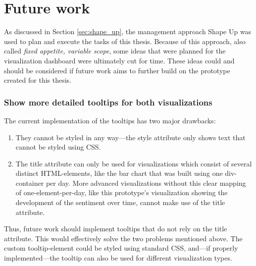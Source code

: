 \section{Future work}\label{sec:cutForTime}
As discussed in Section \ref{sec:shape_up}, the management approach Shape Up was used to plan and execute the tasks of this thesis. Because of this approach, also called \emph{fixed appetite, variable scope}, some ideas that were planned for the visualization dashboard were ultimately cut for time. These ideas could and should be considered if future work aims to further build on the prototype created for this thesis.

\subsubsection*{Show more detailed tooltips for both visualizations}\label{fw_tooltips}
The current implementation of the tooltips has two major drawbacks:
\begin{enumerate}
    \item They cannot be styled in any way---the style attribute only shows text that cannot be styled using CSS.
    \item The title attribute can only be used for visualizations which consist of several distinct HTML-elements, like the bar chart that was built using one div-container per day. More advanced visualizations without this clear mapping of one-element-per-day, like this prototype's visualization showing the development of the sentiment over time, cannot make use of the title attribute.
\end{enumerate}

Thus, future work should implement tooltips that do not rely on the title attribute. This would effectively solve the two problems mentioned above. The custom tooltip-element could be styled using standard CSS, and---if properly implemented---the tooltip can also be used for different visualization types. 

